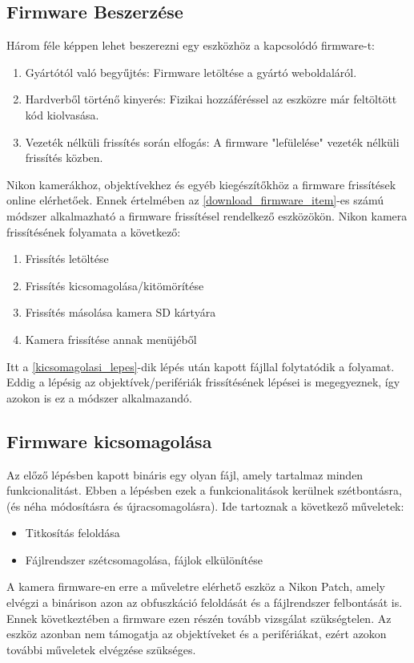 \subsection{Firmware Beszerzése}
Három féle képpen lehet beszerezni egy eszközhöz a kapcsolódó firmware-t:
\begin{enumerate}
    \item Gyártótól való begyűjtés: Firmware letöltése a gyártó weboldaláról. \label{download_firmware_item}
    \item Hardverből történő kinyerés: Fizikai hozzáféréssel az eszközre már feltöltött kód kiolvasása.
    \item Vezeték nélküli frissítés során elfogás: A firmware "lefülelése" vezeték nélküli frissítés közben.
\end{enumerate} \cite{nadir2022taxonomy}
Nikon kamerákhoz, objektívekhez és egyéb kiegészítőkhöz a firmware frissítések online elérhetőek.
Ennek értelmében az \ref{download_firmware_item}-es számú módszer alkalmazható a firmware frissítésel rendelkező eszközökön.
Nikon kamera frissítésének folyamata a következő:
\begin{enumerate}
    \item Frissítés letöltése
    \item Frissítés kicsomagolása/kitömörítése \label{kicsomagolasi_lepes}
    \item Frissítés másolása kamera SD kártyára
    \item Kamera frissítése annak menüjéből
\end{enumerate}\cite{nikond5100_update_manual}
Itt a \ref{kicsomagolasi_lepes}-dik lépés után kapott fájllal folytatódik a folyamat.
Eddig a lépésig az objektívek/perifériák frissítésének lépései is megegyeznek, így azokon is ez a módszer alkalmazandó.
\subsection{Firmware kicsomagolása}
Az előző lépésben kapott bináris egy olyan fájl, amely tartalmaz minden funkcionalitást.
Ebben a lépésben ezek a funkcionalitások kerülnek szétbontásra, (és néha módosításra és újracsomagolásra).
Ide tartoznak a következő műveletek:
\begin{itemize}
    \item Titkosítás feloldása
    \item Fájlrendszer szétcsomagolása, fájlok elkülönítése
\end{itemize}\cite{nadir2022taxonomy}
A kamera firmware-en erre a műveletre elérhető eszköz a Nikon Patch\cite{Nikon_Patch}, amely elvégzi a binárison azon az obfuszkáció feloldását és a fájlrendszer felbontását is.
Ennek következtében a firmware ezen részén tovább vizsgálat szükségtelen.
Az eszköz azonban nem támogatja az objektíveket és a perifériákat, ezért azokon további műveletek elvégzése szükséges.
